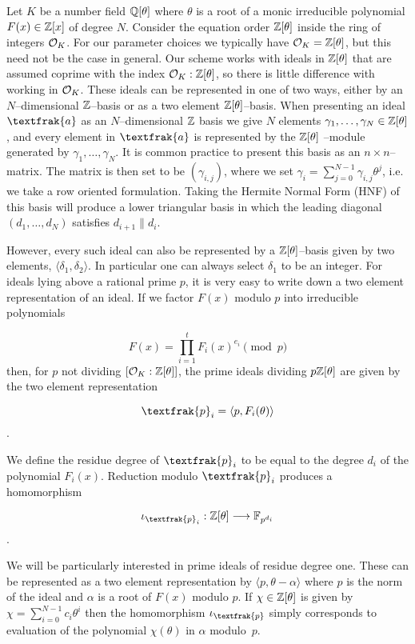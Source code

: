 \documentclass[a4paper, 12pt]{article}
\newcommand{\ndash}{\nobreakdash --}
\begin{document}
	Let $K$ be a number field $\mathbb{Q}[\theta]$ where $\theta$ is a root of a monic irreducible polynomial $F(x) \in \mathbb{Z}[x]$ of degree $N$.
	Consider the equation order $\mathbb{Z}[\theta]$ inside the ring of integers $\mathcal{O}_K$.
	For our parameter choices we typically have $\mathcal{O}_K = \mathbb{Z}[\theta]$, but this need not be the case in general.
	Our scheme works with ideals in $\mathbb{Z}[\theta]$ that are assumed coprime with the index $\mathcal{O}_K: \mathbb{Z}[\theta]$, so there is little difference with working in $\mathcal{O}_K$.
	These ideals can be represented in one of two ways, either by an $N$\ndash dimensional $\mathbb{Z}$\ndash basis or as a two element $\mathbb{Z}[\theta]$\ndash basis.
	When presenting an ideal $\textfrak{a}$ as an $N$\ndash dimensional $\mathbb{Z}$ basis we give $N$ elements $\gamma_1, \ldots, \gamma_N \in \mathbb{Z}[\theta]$, and every element in $\textfrak{a}$ is represented by the $\mathbb{Z}[\theta]$ \ndash module generated by $\gamma_1, \ldots, \gamma_N$.
	It is common practice to present this basis as an $n \times n$\ndash matrix.
	The matrix is then set to be $(\gamma_{i,j})$, where we set $\gamma_i = \sum_{j=0}^{N - 1}{\gamma_{i,j}\theta^j}$, i.e. we take a row oriented formulation. Taking the Hermite Normal Form (HNF) of this basis will
	produce a lower triangular basis in which the leading diagonal $(d_1,\ldots ,d_N)$ satisfies $d_{i+1}\|d_i$.
	
	However, every such ideal can also be represented by a $\mathbb{Z}[\theta]$\ndash basis given by two elements, $\langle \delta_1, \delta_2 \rangle$. In particular one can always select $\delta_1$ to be an integer.
	For ideals lying above a rational prime $p$, it is very easy to write down a two element representation of an ideal. If we factor $F(x)$ modulo $p$ into irreducible
	polynomials
	
	\[
		F(x) = {\prod_{i=1}^{t}{F_i(x)^{e_i}}}\pmod{p}
	\] %
	then, for $p$ not dividing $[\mathcal{O}_K: \mathbb{Z}[\theta]]$, the prime ideals dividing $p\mathbb{Z}[\theta]$ are given by the two element representation
	
	\[
		\textfrak{p}_i = \langle p,F_i(\theta) \rangle
	\].
	
	We define the residue degree of $\textfrak{p}_i$ to be equal to the degree $d_i$ of the polynomial $F_i(x)$. Reduction modulo $\textfrak{p}_i$ produces a homomorphism
	
	\[
		\iota_{\textfrak{p}_i} : \bb{Z}[\theta] \longrightarrow \bb{F}_{p^{d_i}}
	\].
	
	We will be particularly interested in prime ideals of residue degree one. 
	These can be represented as a two element representation by $\langle p, \theta - \alpha \rangle$ where $p$ is the norm of the ideal and $\alpha$ is a root of $F(x)$ modulo $p$.
	If $\chi \in \mathbb{Z}[\theta]$ is given by $\chi = \sum_{i=0}^{N - 1}{c_i \theta^i}$ then the homomorphism $\iota_\textfrak{p}$ simply corresponds to evaluation of the polynomial $\chi(\theta)$ in $\alpha$ modulo~$p$.
	
\end{document}
